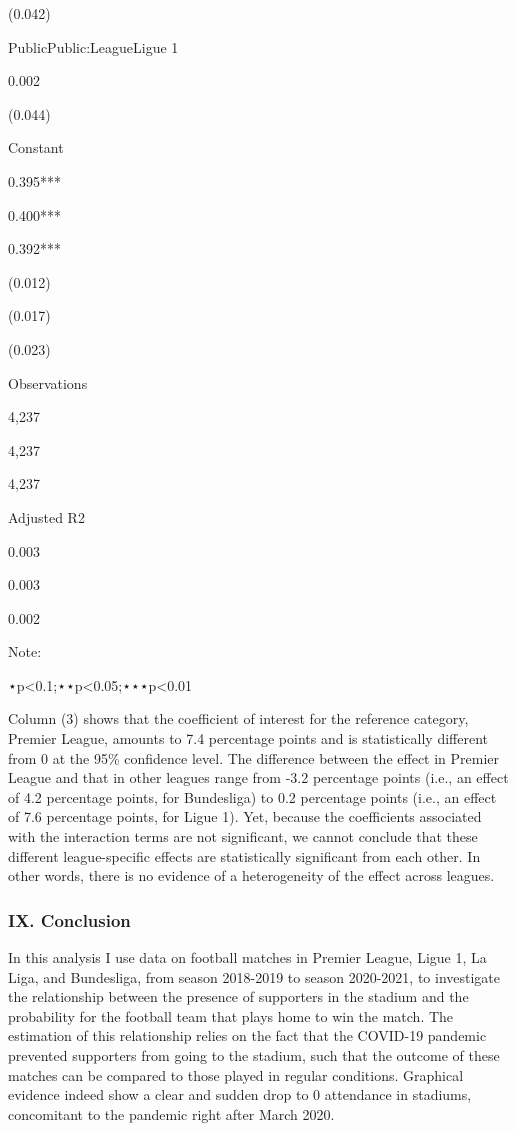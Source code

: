 \documentclass[
]{article}
\begin{document}
(0.042)

PublicPublic:LeagueLigue 1

0.002

(0.044)

Constant

0.395***

0.400***

0.392***

(0.012)

(0.017)

(0.023)

Observations

4,237

4,237

4,237

Adjusted R2

0.003

0.003

0.002

Note:

⋆p\textless0.1;⋆⋆p\textless0.05;⋆⋆⋆p\textless0.01

Column (3) shows that the coefficient of interest for the reference
category, Premier League, amounts to 7.4 percentage points and is
statistically different from 0 at the 95\% confidence level. The
difference between the effect in Premier League and that in other
leagues range from -3.2 percentage points (i.e., an effect of 4.2
percentage points, for Bundesliga) to 0.2 percentage points (i.e., an
effect of 7.6 percentage points, for Ligue 1). Yet, because the
coefficients associated with the interaction terms are not significant,
we cannot conclude that these different league-specific effects are
statistically significant from each other. In other words, there is no
evidence of a heterogeneity of the effect across leagues.

\hypertarget{ix.-conclusion}{%
\subsubsection{IX. Conclusion}\label{ix.-conclusion}}

In this analysis I use data on football matches in Premier League, Ligue
1, La Liga, and Bundesliga, from season 2018-2019 to season 2020-2021,
to investigate the relationship between the presence of supporters in
the stadium and the probability for the football team that plays home to
win the match. The estimation of this relationship relies on the fact
that the COVID-19 pandemic prevented supporters from going to the
stadium, such that the outcome of these matches can be compared to those
played in regular conditions. Graphical evidence indeed show a clear and
sudden drop to 0 attendance in stadiums, concomitant to the pandemic
right after March 2020.
\end{document}
